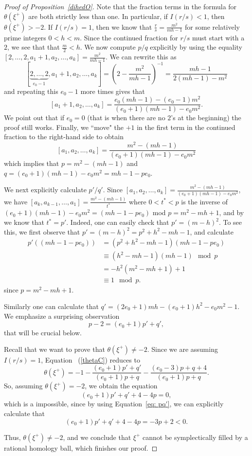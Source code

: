 \documentclass[11pt]{amsart}
\theoremstyle{plain}
\theoremstyle{definition}
\theoremstyle{remark}
\numberwithin{theorem}{section}
\begin{document}
\begin{proof}[Proof of Proposition~\ref{dihedO}]
Note that the fraction terms in the formula for $\theta(\xi^{+})$ are both strictly less than one. In particular, if $I(r/s)<1$, then $\theta(\xi^+)>-2$. If $I(r/s)=1$, then we know that $\frac{r}{s}=\frac{m^2}{mh-1}$ for some relatively prime integers $0<h<m$. Since the continued fraction for $r/s$ must start with a $2$, we see that  that $\frac{m}{2}<h$. We now compute $p/q$ explicitly by using the equality $[2, \ldots, 2, a_1+1, a_2, \ldots, a_k]=\frac{m^2}{mh-1}$. We can rewrite this as  \[[\underbrace{2, \ldots, 2}_{e_0-1}, a_1+1, a_2, \ldots, a_k]=(2-\frac{m^2}{mh-1})^{-1}=\frac{mh-1}{2(mh-1)-m^2}\] 
and repeating this $e_0-1$ more times gives that \[[a_1+1, a_2, \ldots, a_k]=\frac{e_0(mh-1)-(e_0-1)m^2}{(e_0+1)(mh-1)-e_0m^2}.\] 
 We point out that if $e_0=0$ (that is when there are no $2$'s at the beginning) the proof still works. Finally,  we ``move" the $+1$ in the first term in the continued fraction to the right-hand side to obtain
\[[a_1, a_2, \ldots, a_k]=\frac{m^2-(mh-1)}{(e_0+1)(mh-1)-e_0m^2}\] which implies that $p=m^2-(mh-1)$ and $q=(e_0+1)(mh-1)-e_0m^2=mh-1-pe_0$.

We next explicitly calculate $p'/q'$. Since $[a_1, a_2, \ldots, a_k]=\frac{m^2-(mh-1)}{(e_0+1)(mh-1)-e_0m^2}$, we have $[a_k, a_{k-1}, \ldots, a_1]=\frac{m^2-(mh-1)}{t^*}$ where $0<t^*<p$ is the inverse of $(e_0+1)(mh-1)-e_0m^2=(mh-1-pe_0)$ mod $p=m^2-mh+1$, and by \cite[Lemma~A4]{OrlikWagreich77} we know that $t^*=p'$. Indeed, one can easily check that $p'=(m-h)^2$. To see this, we first observe that $p'=(m-h)^2=p^2+h^2-mh-1$, and calculate 
\[
\begin{split}
p'((mh-1-pe_0))&=(p^2+h^2-mh-1)(mh-1-pe_0)\\
& \equiv (h^2-mh-1)(mh-1) \mod p\\
&=-h^2(m^2-mh+1)+1 \\
& \equiv 1 \mod p.
\end{split}
\] since $p=m^2-mh+1.$


Similarly one can calculate that $q'=(2e_0+1)mh-(e_0+1)h^2-e_0m^2-1$.  We emphasize a surprising observation 
\begin{equation}\label{eq: pq'}
p-2=(e_0+1)p'+q',
\end{equation}
that will be crucial below.

Recall that we want to prove that $\theta(\xi^+)\neq -2$. Since we are assuming $I(r/s)=1$, Equation ~(\ref{thetaC}) reduces to \[\theta(\xi^+)=-1-\frac{(e_0+1)p'+q'}{(e_0+1)p+q}-\frac{(e_0-3)p+q+4}{(e_0+1)p+q}. \] 
So, assuming  $\theta(\xi^+)=-2$,  we obtain the equation 
$$(e_0+1)p'+q'+4-4p=0,$$
which is a impossible, since by using Equation~\ref{eq: pq'},  we can explicitly calculate that  \[(e_0+1)p'+q'+4-4p=-3p+2<0.\]

Thus, $\theta(\xi^+)\neq -2$, and we conclude that  $\xi^+$ cannot be symplectically filled by a rational homology ball, which finishes our proof.   
\end{proof}
\end{document}
